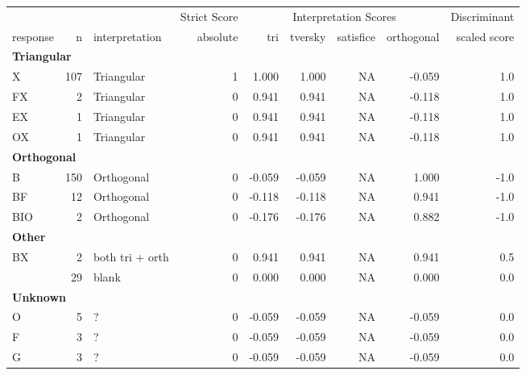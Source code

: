 \documentclass[
  letterpaper,
  DIV=11,
  numbers=noendperiod]{scrreprt}
\begin{document}
\begin{tabular}[t]{l|r|l|r|r|r|r|r|r}
\hline
\multicolumn{3}{c|}{ } & \multicolumn{1}{c|}{Strict Score} & \multicolumn{4}{c|}{Interpretation Scores} & \multicolumn{1}{c}{Discriminant} \\
\cline{4-4} \cline{5-8} \cline{9-9}
response & n & interpretation & absolute & tri & tversky & satisfice & orthogonal & scaled score\\
\hline
\multicolumn{9}{l}{\textbf{Triangular}}\\
\hline
\hspace{1em}X & 107 & Triangular & 1 & 1.000 & 1.000 & NA & -0.059 & 1.0\\
\hline
\hspace{1em}FX & 2 & Triangular & 0 & 0.941 & 0.941 & NA & -0.118 & 1.0\\
\hline
\hspace{1em}EX & 1 & Triangular & 0 & 0.941 & 0.941 & NA & -0.118 & 1.0\\
\hline
\hspace{1em}OX & 1 & Triangular & 0 & 0.941 & 0.941 & NA & -0.118 & 1.0\\
\hline
\multicolumn{9}{l}{\textbf{Orthogonal}}\\
\hline
\hspace{1em}B & 150 & Orthogonal & 0 & -0.059 & -0.059 & NA & 1.000 & -1.0\\
\hline
\hspace{1em}BF & 12 & Orthogonal & 0 & -0.118 & -0.118 & NA & 0.941 & -1.0\\
\hline
\hspace{1em}BIO & 2 & Orthogonal & 0 & -0.176 & -0.176 & NA & 0.882 & -1.0\\
\hline
\multicolumn{9}{l}{\textbf{Other}}\\
\hline
\hspace{1em}BX & 2 & both tri + orth & 0 & 0.941 & 0.941 & NA & 0.941 & 0.5\\
\hline
\hspace{1em} & 29 & blank & 0 & 0.000 & 0.000 & NA & 0.000 & 0.0\\
\hline
\multicolumn{9}{l}{\textbf{Unknown}}\\
\hline
\hspace{1em}O & 5 & ? & 0 & -0.059 & -0.059 & NA & -0.059 & 0.0\\
\hline
\hspace{1em}F & 3 & ? & 0 & -0.059 & -0.059 & NA & -0.059 & 0.0\\
\hline
\hspace{1em}G & 3 & ? & 0 & -0.059 & -0.059 & NA & -0.059 & 0.0\\

\end{tabular}
\end{document}

